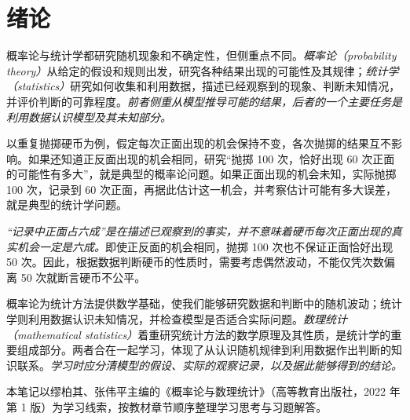 \chapter{绪论}

概率论与统计学都研究随机现象和不确定性，但侧重点不同。\emph{概率论（probability theory）}从给定的假设和规则出发，研究各种结果出现的可能性及其规律；\emph{统计学（statistics）}研究如何收集和利用数据，描述已经观察到的现象、判断未知情况，并评价判断的可靠程度。\emph{前者侧重从模型推导可能的结果，后者的一个主要任务是利用数据认识模型及其未知部分。}

以重复抛掷硬币为例，假定每次正面出现的机会保持不变，各次抛掷的结果互不影响。如果还知道正反面出现的机会相同，研究“抛掷 100 次，恰好出现 60 次正面的可能性有多大”，就是典型的概率论问题。如果正面出现的机会未知，实际抛掷 100 次，记录到 60 次正面，再据此估计这一机会，并考察估计可能有多大误差，就是典型的统计学问题。

\emph{“记录中正面占六成”是在描述已观察到的事实，并不意味着硬币每次正面出现的真实机会一定是六成。}即使正反面的机会相同，抛掷 100 次也不保证正面恰好出现 50 次。因此，根据数据判断硬币的性质时，需要考虑偶然波动，不能仅凭次数偏离 50 次就断言硬币不公平。

概率论为统计方法提供数学基础，使我们能够研究数据和判断中的随机波动；统计学则利用数据认识未知情况，并检查模型是否适合实际问题。\emph{数理统计（mathematical statistics）}着重研究统计方法的数学原理及其性质，是统计学的重要组成部分。两者合在一起学习，体现了从认识随机规律到利用数据作出判断的知识联系。\emph{学习时应分清模型的假设、实际的观察记录，以及据此能够得到的结论。}

本笔记以缪柏其、张伟平主编的《概率论与数理统计》（高等教育出版社，2022 年第 1 版）为学习线索，按教材章节顺序整理学习思考与习题解答。



